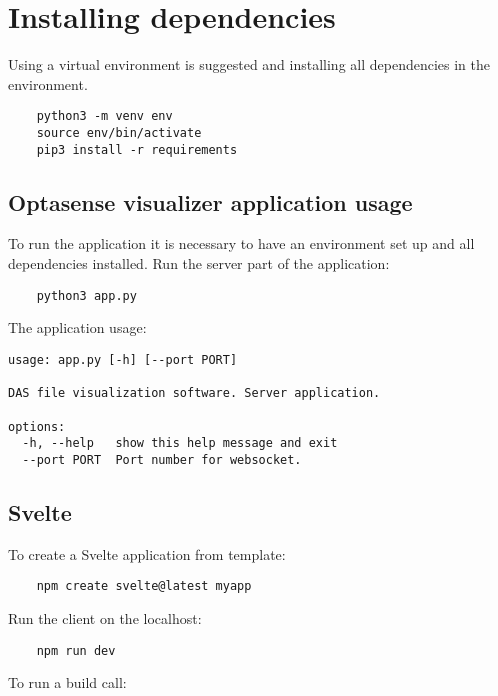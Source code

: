 \chapter{Installing dependencies}\label{atach:dependencies}

Using a virtual environment is suggested and installing all dependencies in the environment.

\begin{verbatim}
    python3 -m venv env
    source env/bin/activate
    pip3 install -r requirements
\end{verbatim}

\section{Optasense visualizer application usage}\label{usage}

To run the application it is necessary to have an environment set up and all dependencies installed.
\textit{} \newline
Run the server part of the application:
\begin{verbatim}
    python3 app.py
\end{verbatim}

\textit{} \newline
The application usage:

\begin{verbatim}
usage: app.py [-h] [--port PORT]

DAS file visualization software. Server application.

options:
  -h, --help   show this help message and exit
  --port PORT  Port number for websocket.
\end{verbatim}


\section{Svelte}\label{attach:svelte}
\textit{} \newline
To create a Svelte application from template:

\begin{verbatim}
    npm create svelte@latest myapp
\end{verbatim}

Run the client on the localhost:

\begin{verbatim}
    npm run dev
\end{verbatim}

To run a build call:


